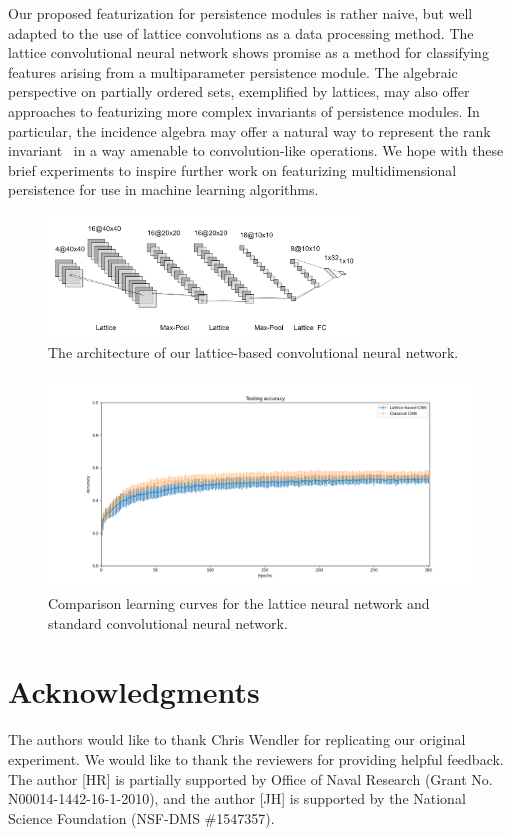 \documentclass{article}
\begin{document}
Our proposed featurization for persistence modules is rather naive, but well
adapted to the use of lattice convolutions as a data processing method. The
lattice convolutional neural network shows promise as a method for classifying
features arising from a multiparameter persistence module. The algebraic
perspective on partially ordered sets, exemplified by lattices, may also offer
approaches to featurizing more complex invariants of persistence modules. In
particular, the incidence algebra may offer a natural way to represent the rank
invariant~\cite{carlsson_theory_2009} in a way amenable to convolution-like
operations.
We hope with these brief experiments to inspire further work on featurizing
multidimensional persistence for use in machine learning algorithms.

\begin{figure}[h!]
  \caption{The architecture of our lattice-based convolutional neural network.}\label{fig:architecture}
    \begin{center}
    \includegraphics[width=0.75\textwidth]{nn.jpg}
    \end{center}
\end{figure}

\begin{figure}[h!]
  \caption{Comparison learning curves for the lattice neural network and
    standard convolutional neural network.}\label{fig:comparison}
    \begin{center}
      \includegraphics[width=\textwidth]{test_results_2.png}
    \end{center}
\end{figure}

\section*{Acknowledgments}
The authors would like to thank Chris Wendler for replicating our original
experiment. We would like to thank the reviewers for providing helpful feedback.
The author [HR] is partially supported by Office of Naval Research (Grant No.
N00014-1442-16-1-2010), and the author [JH] is supported by the National Science
Foundation (NSF-DMS \#1547357).
\small


\end{document}
